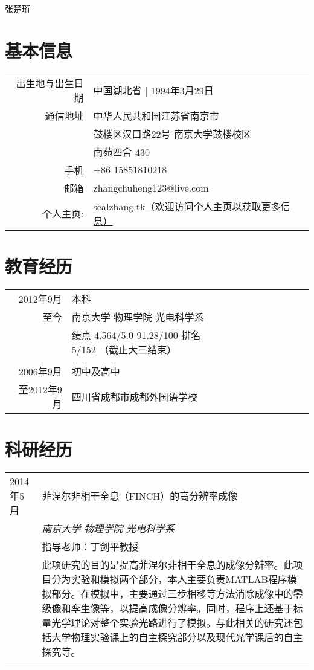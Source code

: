 \documentclass[CHN]{SealZhang}
\begin{document}
\par{\centering
		{%
		\Huge \textsc{张楚珩} }
		\bigskip\par}



\section{基本信息}

\begin{tabular}{rl}
    \textsc{出生地与出生日期} & 中国湖北省  | 1994年3月29日 \\
    \textsc{通信地址}   & 中华人民共和国江苏省南京市 \\
                        & 鼓楼区汉口路22号 南京大学鼓楼校区\\
                        & 南苑四舍 430\\
    \textsc{手机}     & +86 15851810218\\
    \textsc{邮箱}     & zhangchuheng123@live.com \\
    \textsc{个人主页:}  & \href{http://sealzhang.tk}{sealzhang.tk（欢迎访问个人主页以获取更多信息）} 
\end{tabular}

\section{教育经历}
\begin{tabular}{rl}	
2012年9月 & 本科\\
至今 & 南京大学 物理学院 光电科学系\\
&\normalsize \textsc{\underline{绩点}} 4.564/5.0 91.28/100 \textsc{\underline{排名}} 5/152 （截止大三结束）\\
\\
2006年9月 & 初中及高中\\
至2012年9月 & 四川省成都市成都外国语学校\\

\end{tabular}

\section{科研经历}
\begin{tabular}{p{2cm}|p{12cm}}

\textsc{2014年5月} 
& 菲涅尔非相干全息（FINCH）的高分辨率成像\\
&\emph{南京大学 物理学院 光电科学系}\\
& 指导老师：丁剑平教授 \\
&\footnotesize{此项研究的目的是提高菲涅尔非相干全息的成像分辨率。此项目分为实验和模拟两个部分，本人主要负责MATLAB程序模拟部分。在模拟中，主要通过三步相移等方法消除成像中的零级像和孪生像等，以提高成像分辨率。同时，程序上还基于标量光学理论对整个实验光路进行了模拟。与此相关的研究还包括大学物理实验课上的自主探究部分以及现代光学课后的自主探究等。}\\
\multicolumn{2}{c}{} \\
\end{tabular}
\end{document}
